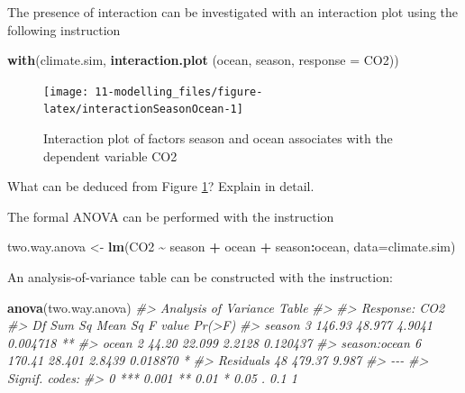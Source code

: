 \documentclass[
]{book}
\newenvironment{Shaded}{\begin{snugshade}}{\end{snugshade}}
\newcommand{\AttributeTok}[1]{\textcolor[rgb]{0.13,0.29,0.53}{#1}}
\newcommand{\CommentTok}[1]{\textcolor[rgb]{0.56,0.35,0.01}{\textit{#1}}}
\newcommand{\FunctionTok}[1]{\textcolor[rgb]{0.13,0.29,0.53}{\textbf{#1}}}
\newcommand{\NormalTok}[1]{#1}
\newcommand{\OtherTok}[1]{\textcolor[rgb]{0.56,0.35,0.01}{#1}}
\newcommand{\SpecialCharTok}[1]{\textcolor[rgb]{0.81,0.36,0.00}{\textbf{#1}}}
\begin{document}
The presence of interaction can be investigated with an interaction plot using the following instruction

\begin{Shaded}
\begin{Highlighting}[]
\FunctionTok{with}\NormalTok{(climate.sim, }\FunctionTok{interaction.plot}\NormalTok{ (ocean, season, }\AttributeTok{response =}\NormalTok{ CO2)) }
\end{Highlighting}
\end{Shaded}

\begin{figure}
\texttt{[image: 11-modelling\_files/figure-latex/interactionSeasonOcean-1]} \caption{Interaction plot of factors season and ocean associates with the dependent variable CO2}\label{fig:interactionSeasonOcean}
\end{figure}

What can be deduced from Figure \ref{fig:interactionSeasonOcean}? Explain in detail.

The formal ANOVA can be performed with the instruction

\begin{Shaded}
\begin{Highlighting}[]
\NormalTok{two.way.anova }\OtherTok{\textless{}{-}} \FunctionTok{lm}\NormalTok{(CO2 }\SpecialCharTok{\textasciitilde{}}\NormalTok{ season }\SpecialCharTok{+}\NormalTok{ ocean }\SpecialCharTok{+}\NormalTok{ season}\SpecialCharTok{:}\NormalTok{ocean, }\AttributeTok{data=}\NormalTok{climate.sim)}
\end{Highlighting}
\end{Shaded}

An analysis-of-variance table can be constructed with the instruction:

\begin{Shaded}
\begin{Highlighting}[]
\FunctionTok{anova}\NormalTok{(two.way.anova)}
\CommentTok{\#\textgreater{} Analysis of Variance Table}
\CommentTok{\#\textgreater{} }
\CommentTok{\#\textgreater{} Response: CO2}
\CommentTok{\#\textgreater{}              Df Sum Sq Mean Sq F value   Pr(\textgreater{}F)   }
\CommentTok{\#\textgreater{} season        3 146.93  48.977  4.9041 0.004718 **}
\CommentTok{\#\textgreater{} ocean         2  44.20  22.099  2.2128 0.120437   }
\CommentTok{\#\textgreater{} season:ocean  6 170.41  28.401  2.8439 0.018870 * }
\CommentTok{\#\textgreater{} Residuals    48 479.37   9.987                    }
\CommentTok{\#\textgreater{} {-}{-}{-}}
\CommentTok{\#\textgreater{} Signif. codes:  }
\CommentTok{\#\textgreater{} 0 \textquotesingle{}***\textquotesingle{} 0.001 \textquotesingle{}**\textquotesingle{} 0.01 \textquotesingle{}*\textquotesingle{} 0.05 \textquotesingle{}.\textquotesingle{} 0.1 \textquotesingle{} \textquotesingle{} 1}
\end{Highlighting}
\end{Shaded}
\end{document}
